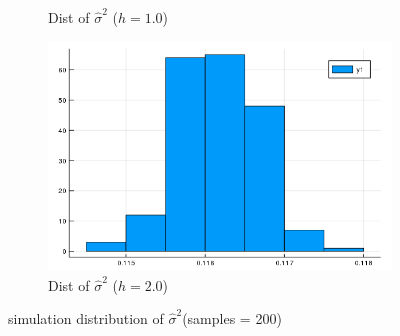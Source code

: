 \documentclass{beamer}
\begin{document}
\begin{frame}
\begin{figure}[htb]
\begin{subfigure}[b]{0.24\linewidth}
      \caption{Dist of $\hat{\sigma}^2$ ($h=1.0$)}
    \end{subfigure}
    \begin{subfigure}[b]{0.24\linewidth}
      \includegraphics[width=\linewidth]{images/std_est_4.png}
      \caption{Dist of $\hat{\sigma}^2$ ($h=2.0$)}
    \end{subfigure}
    \caption{simulation distribution of $\hat{\sigma}^2$(samples = 200)}
    \label{fig:std_est}
  \end{figure}
  
\end{frame}
\end{document}
